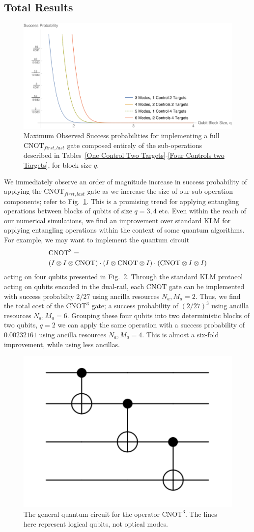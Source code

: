 \documentclass[aps,pra,twocolumn,showpacs,superscriptaddress,floatfix,10pt]{revtex4}
\begin{document}
 \subsection{Total Results}
 \begin{figure}[H]
 	\centering
 	\includegraphics[width=0.55 \textwidth]{./blockencodingresults.pdf}
 	\caption{Maximum Observed Success probabilities for implementing a full $\mbox{CNOT}_{first,last}$ gate composed entirely of the sub-operations described in Tables~\ref{One Control Two Targets}-\ref{Four Controls two Targets}, for block size $q$.}
 	\label{Figure - Block Encoding Results}
 \end{figure}
 We immediately observe an order of magnitude increase in success probability of applying the $\mbox{CNOT}_{first,last}$ gate as we increase the size of our sub-operation components; refer to Fig.~\ref{Figure - Block Encoding Results}. This is a promising trend for applying entangling operations between blocks of qubits of size $q=3,4$ etc. Even within the reach of our numerical simulations, we find an improvement over standard KLM for applying entangling operations within the context of some quantum algorithms. For example, we may want to implement the quantum circuit 
 \begin{eqnarray}
 \small & \mbox{CNOT}^3 = \\ \small \nonumber & (I \otimes I \otimes \mbox{CNOT}) \cdot (I \otimes  \mbox{CNOT} \otimes I) \cdot (\mbox{CNOT} \otimes I \otimes I)
 \end{eqnarray}
 acting on four qubits presented in Fig.~\ref{Three CNOTs}. Through the standard KLM protocol acting on qubits encoded in the dual-rail, each CNOT gate can be implemented with success probabilty $2/27$ using ancilla resources $N_a,M_a=2$. Thus, we find the total cost of the $\mbox{CNOT}^3$ gate; a success probability of $(2/27)^3$ using ancilla resources $ N_a,M_a = 6 $. Grouping these four qubits into two deterministic blocks of two qubits, $q=2$ we can apply the same operation with a success probability of $0.00232161$ using ancilla resources $ N_a,M_a=4 $. This is almost a six-fold improvement, while using less ancillas.
 \begin{figure}[ht]
 	\centering
 	\includegraphics[width=0.25 \textwidth]{./ThreeCNOTs.pdf}
 	\caption{The general quantum circuit for the operator $\mbox{CNOT}^3$. The lines here represent logical qubits, not optical modes.}
 	\label{Three CNOTs}
 \end{figure}
\end{document}
